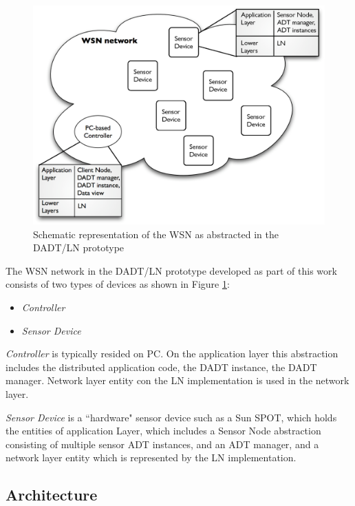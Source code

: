 \begin{figure}
\centering
\includegraphics[scale=0.55]{img/DADTLN_glossary.eps} 
\caption[WSN in DADT/LN prototype]{Schematic representation of the WSN as
abstracted in the DADT/LN prototype}
\label{Fig:DADTLN_glossary}
\end{figure} 

The WSN network in the DADT/LN prototype developed as part of
this work consists of two types of devices as shown in Figure
\ref{Fig:DADTLN_glossary}:
\begin{itemize}
  \item \emph{Controller}
  \item \emph{Sensor Device}
\end{itemize}  
   
\emph{Controller} is typically resided on PC. On the application layer this
abstraction includes the distributed application code, the DADT
instance, the DADT manager. Network layer entity con the LN implementation is
used in the network layer.
  
\emph{Sensor Device} is a ``hardware" sensor device such as a Sun SPOT, 
which holds the entities of application Layer, which includes a Sensor Node
abstraction consisting of multiple sensor ADT instances, and an ADT
manager, and a network layer entity which is represented by the LN implementation.

\subsection{Architecture}


